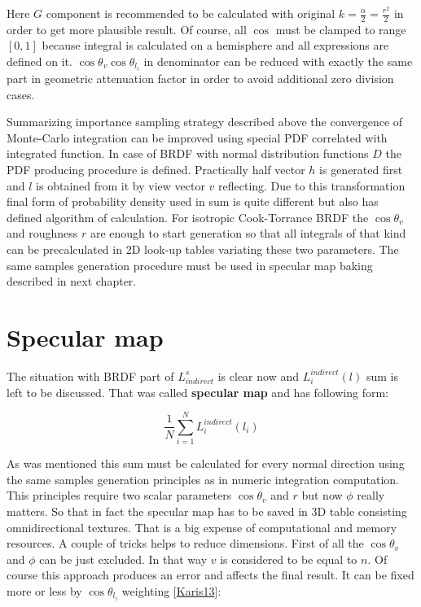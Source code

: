 Here $G$ component is recommended to be calculated with original $k=\frac{\alpha}{2} = \frac{r^2}{2}$ in order to get more plausible result. Of course, all $\cos$ must be clamped to range $[0, 1]$ because integral is calculated on a hemisphere and all expressions are defined on it. $\cos\theta_v \cos\theta_{l_i}$ in denominator can be reduced with exactly the same part in geometric attenuation factor in order to avoid additional zero division cases.

Summarizing importance sampling strategy described above the convergence of Monte-\/\+Carlo integration can be improved using special P\+DF correlated with integrated function. In case of B\+R\+DF with normal distribution functions $D$ the P\+DF producing procedure is defined. Practically half vector $h$ is generated first and $l$ is obtained from it by view vector $v$ reflecting. Due to this transformation final form of probability density used in sum is quite different but also has defined algorithm of calculation. For isotropic Cook-\/\+Torrance B\+R\+DF the $\cos\theta_v$ and roughness $r$ are enough to start generation so that all integrals of that kind can be precalculated in 2D look-\/up tables variating these two parameters. The same samples generation procedure must be used in specular map baking described in next chapter.\hypertarget{specification__pbr_math_pbr_specular_map}{}\section{Specular map}\label{specification__pbr_math_pbr_specular_map}
The situation with B\+R\+DF part of $L_{indirect}^s$ is clear now and $L_i^{indirect}(l)$ sum is left to be discussed. That was called {\bfseries specular map} and has following form\+:

\[\frac{1}{N}\sum_{i=1}^N L_i^{indirect}(l_i)\]

As was mentioned this sum must be calculated for every normal direction using the same samples generation principles as in numeric integration computation. This principles require two scalar parameters $\cos\theta_v$ and $r$ but now $\phi$ really matters. So that in fact the specular map has to be saved in 3D table consisting omnidirectional textures. That is a big expense of computational and memory resources. A couple of tricks helps to reduce dimensions. First of all the $\cos\theta_v$ and $\phi$ can be just excluded. In that way $v$ is considered to be equal to $n$. Of course this approach produces an error and affects the final result. It can be fixed more or less by $\cos\theta_{l_i}$ weighting \mbox{[}\hyperlink{specification__pbr_math_Karis13}{Karis13}\mbox{]}\+:

